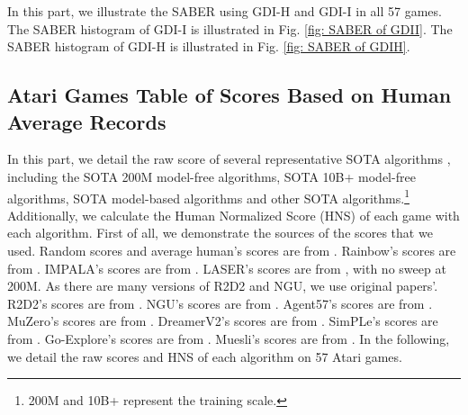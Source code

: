 \documentclass[nohyperref]{article}
\theoremstyle{plain}
\begin{document}
In this part, we  illustrate the SABER \citep{dreamerv2,atarihuman} using GDI-H and  GDI-I in all 57 games. The SABER histogram of GDI-I is illustrated in Fig. \ref{fig: SABER of GDII}. The SABER histogram of GDI-H is illustrated in Fig. \ref{fig: SABER of GDIH}.

\begin{figure*}[!ht]
	\caption{SABER (\%) of Atari 57 games using GDI-I.}
	\label{fig: SABER of GDII}
\end{figure*}


\begin{figure*}[!ht]
	\caption{SABER (\%) of Atari 57 games using GDI-H. }
	\label{fig: SABER of GDIH}
\end{figure*}
\clearpage




\subsection{Atari Games Table of Scores Based on Human Average Records}
\label{app: Atari Games Table of Scores Based on Human Average Records}
In this part, we detail the raw score of several representative SOTA algorithms , including the SOTA 200M model-free algorithms, SOTA 10B+ model-free algorithms, SOTA model-based algorithms and other SOTA algorithms.\footnote{200M and 10B+ represent the training scale.} Additionally, we calculate the Human Normalized Score (HNS) of each game with each algorithm. First of all, we demonstrate the sources of the scores that we used.
Random scores and average human's scores are from \citep{agent57}.
Rainbow's scores are from \citep{rainbow}.
IMPALA's scores are from \citep{impala}.
LASER's scores are from \citep{laser}, with no sweep at 200M.
As there are many versions of R2D2 and NGU, we use original papers'.
R2D2's scores are from \citep{r2d2}.
NGU's scores are from \citep{ngu}.
Agent57's scores are from \citep{agent57}.
MuZero's scores are from \citep{muzero}.
DreamerV2's scores are from \citep{dreamerv2}.
SimPLe's scores are from \citep{modelbasedatari}.
Go-Explore's scores are from \citep{goexplore}.
Muesli's scores are from \citep{muesli}.
In the following,  we detail the raw scores and HNS of each algorithm on 57 Atari games.
\end{document}
